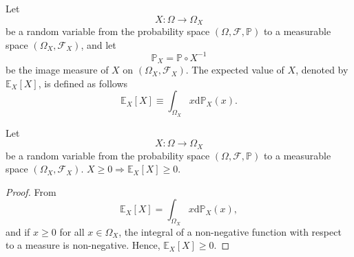 \begin{definition}
	\label{def:expectation_image}
	Let 
	\begin{equation}
		X\colon \Omega \to \Omega_X
	\end{equation}
	be a random variable from the probability space $(\Omega, \mathcal{F}, \mathbb{P})$ to a measurable space $(\Omega_X, \mathcal{F}_X)$, and let
	\begin{equation}
		\mathbb{P}_X = \mathbb{P} \circ X^{-1}
	\end{equation} 
	be the image measure of $X$ on $(\Omega_X, \mathcal{F}_X)$. The expected value of $X$, denoted by $\mathbb{E}_X[X]$, is defined as follows
	\begin{equation}
		\mathbb{E}_X[X] \equiv \int_{\Omega_X} x \mathrm{d}\mathbb{P}_X(x).
		\label{eq:expected_value_image}
	\end{equation}
\end{definition}

\begin{theorem}
	Let 
	\begin{equation}
		X\colon \Omega \to \Omega_X
	\end{equation}
	be a random variable from the probability space $(\Omega, \mathcal{F}, \mathbb{P})$ to a measurable space $(\Omega_X, \mathcal{F}_X)$. $X\geq 0 \Rightarrow \mathbb{E}_X[X]\geq 0$.
\end{theorem}
\begin{proof}
	From  
	\begin{equation}
		\mathbb{E}_X[X] = \int_{\Omega_X}x \mathrm{d}\mathbb{P}_X(x),
	\end{equation}
	and if $x \ge 0$ for all $x \in \Omega_X$, the integral of a non-negative function with respect to a measure is non-negative. Hence, $\mathbb{E}_X[X] \ge 0$.
\end{proof}

